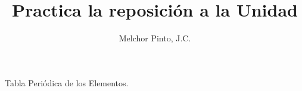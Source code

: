 \documentclass[12pt,addpoints]{repaso}
\title{Practica la reposición a la Unidad}
\author{Melchor Pinto, J.C.}
\begin{document}
\INFO
\begin{questions}
    \questionboxed[10]{}
    \questionboxed[10]{}
    \questionboxed[10]{}
    \questionboxed[5]{}
    \questionboxed[10]{}
    \begin{multicols}{2}
        \questionboxed[10]{}
        \questionboxed[10]{}
    \end{multicols}
     \questionboxed[10]{}
    \questionboxed[10]{}
    \questionboxed[10]{}
    \questionboxed[10]{}
\end{questions}
\begin{landscape}
    \begin{minipage}[b]{\textwidth}
        \thispagestyle{foot}
        \begin{table}[H]
            \centering
            \caption{Tabla Peri\'odica de los Elementos.}
            \TablaPeriodica[0.48]
            \label{tab:periodic_table}
        \end{table}
    \end{minipage}
\end{landscape}
\end{document}
